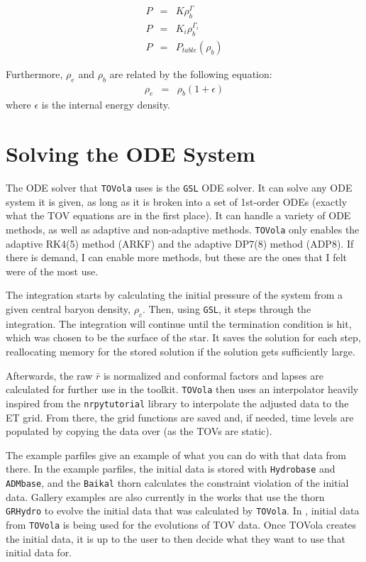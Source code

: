 \begin{eqnarray}
    P & = & K\rho_b^{\Gamma} \\
    P & = & K_i\rho_b^{\Gamma_i} \\
    P & = & P_{table}(\rho_b)
\end{eqnarray}

Furthermore, $\rho_e$ and $\rho_b$ are related by the following equation:
\begin{eqnarray}
    \rho_e & = & \rho_b(1+\epsilon)
\end{eqnarray}
where $\epsilon$ is the internal energy density.

\section{Solving the ODE System}

The ODE solver that \texttt{TOVola} uses is the \texttt{GSL} ODE solver. It can solve any ODE system it is given, as long as it is broken into a set of 1st-order ODEs (exactly what the TOV equations are in the first place). It can handle a variety of ODE methods, as well as adaptive and non-adaptive methods. \texttt{TOVola} only enables the adaptive RK4(5) method (ARKF) and the adaptive DP7(8) method (ADP8). If there is demand, I can enable more methods, but these are the ones that I felt were of the most use.

The integration starts by calculating the initial pressure of the system from a given central baryon density, $\rho_c$. Then, using \texttt{GSL}, it steps through the integration. The integration will continue until the termination condition is hit, which was chosen to be the surface of the star. It saves the solution for each step, reallocating memory for the stored solution if the solution gets sufficiently large.

Afterwards, the raw $\bar{r}$ is normalized and conformal factors and lapses are calculated for further use in the toolkit. \texttt{TOVola} then uses an interpolator heavily inspired from the \texttt{nrpytutorial}\cite{TOVola_TOVola_NRpy} library to interpolate the adjusted data to the ET grid. From there, the grid functions are saved and, if needed, time levels are populated by copying the data over (as the TOVs are static).

The example parfiles give an example of what you can do with that data from there. In the example parfiles, the initial data is stored with \texttt{Hydrobase} and \texttt{ADMbase}, and the \texttt{Baikal} thorn calculates the constraint violation of the initial data. Gallery examples are also currently in the works that use the thorn \texttt{GRHydro} to evolve the initial data that was calculated by \texttt{TOVola}. In \cite{TOVola_TOVola_GRHayL}, initial data from \texttt{TOVola} is being used for the evolutions of TOV data. Once TOVola creates the initial data, it is up to the user to then decide what they want to use that initial data for.

